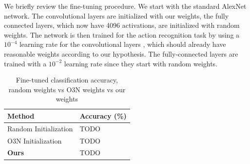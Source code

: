 We briefly review the fine-tuning procedure. We start with the standard AlexNet network. The convolutional layers are initialized with our weights, the fully connected layers, which now have 4096 activations, are initialized with random weights. The network is then trained for the action recognition task by using a $10^{-4}$ learning rate for the convolutional layers , which should already have reasonable weights according to our hypothesis. The fully-connected layers are trained with a $10^{-2}$ learning rate since they start with random weights. 

\begin{table}
    \centering
    \begin{tabu} to 0.5\textwidth {|X[l]|X[c]|}
        \hline
        Method & Accuracy (\%) \\ \hline \hline
        Random Initialization & TODO \\ \hline
        O3N Initialization & TODO \\ \hline
        \textbf{Ours} & TODO \\ \hline
    \end{tabu}
    \caption{Fine-tuned classification accuracy, random weights vs O3N weights vs our weights}
    \label{fig:classres}
\end{table}



